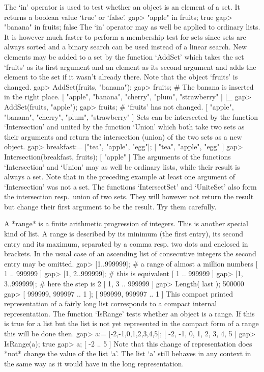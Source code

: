 The `in' operator is  used  to test whether an  object is an element of a
set.  It returns a boolean value `true' or `false'.
\beginexample
    gap> "apple" in fruits;
    true
    gap> "banana" in fruits;
    false 
\endexample
The `in' operator may as well be applied to ordinary lists. It is however
much faster to perform  a membership test for sets  since sets are always
sorted and a binary  search can be used instead  of a linear search.  New
elements may be added to a  set by the function  `AddSet' which takes the
set `fruits' as its first argument and an  element as its second argument
and adds the element to the set if it wasn't already there. Note that the
object `fruits' is changed.
\beginexample
    gap> AddSet(fruits, "banana");
    gap> fruits;  #  The banana is inserted in the right place.
    [ "apple", "banana", "cherry", "plum", "strawberry" ]
|_
    gap> AddSet(fruits, "apple");
    gap> fruits;  #  `fruits' has not changed.
    [ "apple", "banana", "cherry", "plum", "strawberry" ] 
\endexample
Sets can be intersected by the function `Intersection'  and united by the
function `Union' which both take  two sets as their arguments  and return
the intersection (union) of the two sets as a new object.
\beginexample
    gap> breakfast:= ["tea", "apple", "egg"];
    [ "tea", "apple", "egg" ]
    gap> Intersection(breakfast, fruits);
    [ "apple" ] 
\endexample
The arguments of the functions `Intersection' and `Union'  may as well be
ordinary lists,  while  their result is  always  a set. Note that  in the
preceding example at least one argument of  `Intersection' was not a set.
The functions `IntersectSet'  and `UniteSet'  also form the  intersection
resp.~union  of  two sets. They  will  however not return  the result but
change their first argument to be the result. Try them carefully.


A *range* is a finite arithmetic progression of integers. This is another
special kind   of list. A range  is  described by its minimum  (the first
entry), its second entry and its maximum, separated  by a comma resp. two
dots and enclosed in brackets. In the usual case  of an ascending list of
consecutive integers the second entry may be omitted.
\beginexample
    gap> [1..999999];     #  a range of almost a million numbers
    [ 1 .. 999999 ]
    gap> [1, 2..999999];  #  this is equivalent
    [ 1 .. 999999 ]
    gap> [1, 3..999999];  #  here the step is 2
    [ 1, 3 .. 999999 ]
    gap> Length( last );
    500000
    gap> [ 999999, 999997 .. 1 ];
    [ 999999, 999997 .. 1 ]
\endexample
This compact printed representation of a fairly long  list corresponds to
a  compact internal representation.  The function `IsRange' tests whether
an object is a range.  If this is true for a list but the list is not yet
represented in the compact form of a range this will be done then.
\beginexample
    gap> a:= [-2,-1,0,1,2,3,4,5];
    [ -2, -1, 0, 1, 2, 3, 4, 5 ]
    gap> IsRange(a);
    true
    gap> a;
    [ -2 .. 5 ]
\endexample
Note that this  change of representation does  *not* change the  value of
the list `a'. The list `a'  still behaves in any context  in the same way
as it would have in the long representation.

